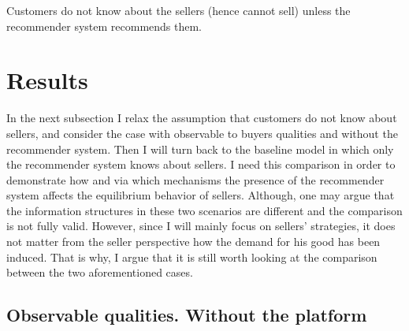 \documentclass[a4paper]{article}
\begin{document}
Customers do not know about the sellers (hence cannot sell) unless the recommender system recommends them.

	
	
	


	

\section{Results}
In the next subsection I relax the assumption that customers do not know about sellers, and consider the case with observable to buyers qualities and without the recommender system. Then I will turn back to the baseline model in which only the recommender system knows about sellers. I need this comparison in order to demonstrate how and via which mechanisms the presence of the recommender system affects the equilibrium behavior of sellers. Although, one may argue that the information structures in these two scenarios are different and the comparison is not fully valid. However, since I will mainly focus on sellers' strategies, it does not matter from the seller perspective how the demand for his good has been induced. That is why, I argue that it is still worth looking at the comparison between the two aforementioned cases. 

	
	
	\subsection{Observable qualities. Without the platform}
\end{document}
